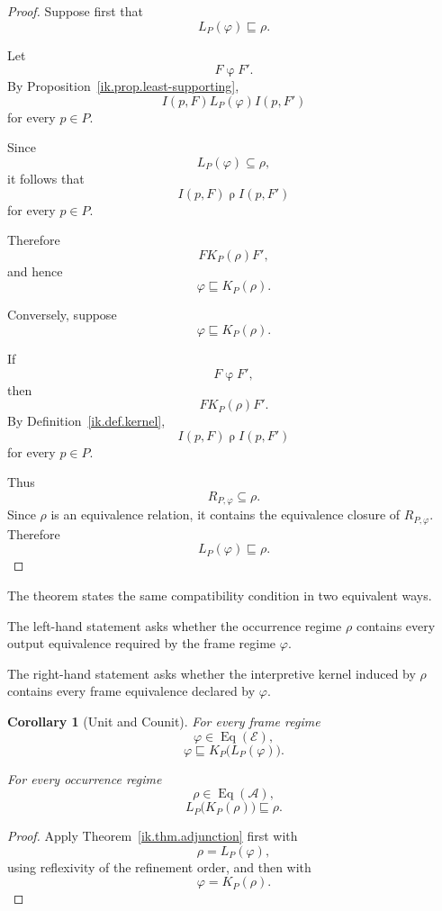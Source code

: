 \documentclass[11pt]{article}
\theoremstyle{plain}
\newtheorem{corollary}[theorem]{Corollary}
\theoremstyle{definition}
\theoremstyle{remark}
\begin{document}
\begin{proof}
  Suppose first that
  \[
    L_P(\varphi)
    \sqsubseteq
    \rho.
  \]

  Let
  \[
    F\mathrel{\varphi}F'.
  \]
  By Proposition~\ref{ik.prop.least-supporting},
  \[
    I(p,F)
    \mathrel{L_P(\varphi)}
    I(p,F')
  \]
  for every \(p\in P\).

  Since
  \[
    L_P(\varphi)
    \subseteq
    \rho,
  \]
  it follows that
  \[
    I(p,F)
    \mathrel{\rho}
    I(p,F')
  \]
  for every \(p\in P\).

  Therefore
  \[
    F\mathrel{K_P(\rho)}F',
  \]
  and hence
  \[
    \varphi
    \sqsubseteq
    K_P(\rho).
  \]

  Conversely,
  suppose
  \[
    \varphi
    \sqsubseteq
    K_P(\rho).
  \]

  If
  \[
    F\mathrel{\varphi}F',
  \]
  then
  \[
    F\mathrel{K_P(\rho)}F'.
  \]
  By Definition~\ref{ik.def.kernel},
  \[
    I(p,F)
    \mathrel{\rho}
    I(p,F')
  \]
  for every \(p\in P\).

  Thus
  \[
    R_{P,\varphi}
    \subseteq
    \rho.
  \]
  Since \(\rho\) is an equivalence relation,
  it contains the equivalence closure of
  \(R_{P,\varphi}\).
  Therefore
  \[
    L_P(\varphi)
    \sqsubseteq
    \rho.
  \]
\end{proof}

The theorem states the same compatibility condition
in two equivalent ways.

The left-hand statement asks whether
the occurrence regime \(\rho\)
contains every output equivalence
required by the frame regime \(\varphi\).

The right-hand statement asks whether
the interpretive kernel induced by \(\rho\)
contains every frame equivalence
declared by \(\varphi\).

\begin{corollary}[Unit and Counit]
  \label{ik.cor.unit-counit}
  For every frame regime
  \[
    \varphi
    \in
    \operatorname{Eq}(\mathcal{E}),
  \]
  \[
    \varphi
    \sqsubseteq
    K_P
    \bigl(
    L_P(\varphi)
    \bigr).
  \]

  For every occurrence regime
  \[
    \rho
    \in
    \operatorname{Eq}(\mathcal{A}),
  \]
  \[
    L_P
    \bigl(
    K_P(\rho)
    \bigr)
    \sqsubseteq
    \rho.
  \]
\end{corollary}

\begin{proof}
  Apply Theorem~\ref{ik.thm.adjunction}
  first with
  \[
    \rho=L_P(\varphi),
  \]
  using reflexivity of the refinement order,
  and then with
  \[
    \varphi=K_P(\rho).
  \]
\end{proof}
\end{document}

